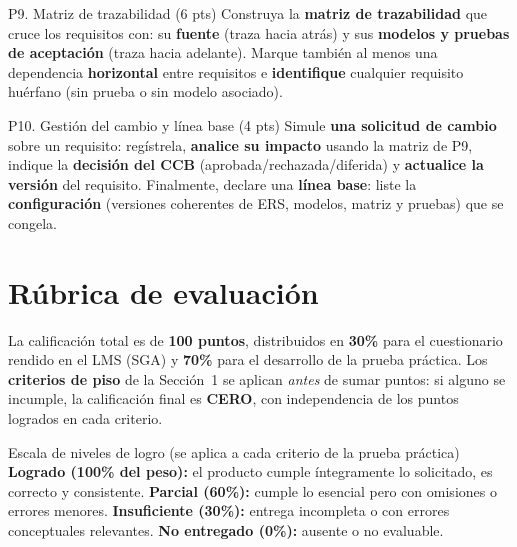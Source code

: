 \documentclass[11pt,a4paper,oneside]{article}
\begin{document}
\begin{tarea}{P9. Matriz de trazabilidad \hfill (6 pts)}
Construya la \textbf{matriz de trazabilidad} que cruce los requisitos con: su \textbf{fuente} (traza hacia atr\'as) y sus \textbf{modelos y pruebas de aceptaci\'on} (traza hacia adelante). Marque tambi\'en al menos una dependencia \textbf{horizontal} entre requisitos e \textbf{identifique} cualquier requisito hu\'erfano (sin prueba o sin modelo asociado).
\end{tarea}

\begin{tarea}{P10. Gesti\'on del cambio y l\'inea base \hfill (4 pts)}
Simule \textbf{una solicitud de cambio} sobre un requisito: reg\'istrela, \textbf{analice su impacto} usando la matriz de P9, indique la \textbf{decisi\'on del CCB} (aprobada/rechazada/diferida) y \textbf{actualice la versi\'on} del requisito. Finalmente, declare una \textbf{l\'inea base}: liste la \textbf{configuraci\'on} (versiones coherentes de ERS, modelos, matriz y pruebas) que se congela.
\end{tarea}

\section{R\'ubrica de evaluaci\'on}

La calificaci\'on total es de \textbf{100 puntos}, distribuidos en \textbf{30\%} para el cuestionario rendido en el LMS (SGA) y \textbf{70\%} para el desarrollo de la prueba pr\'actica. Los \textbf{criterios de piso} de la Secci\'on~1 se aplican \emph{antes} de sumar puntos: si alguno se incumple, la calificaci\'on final es \textbf{CERO}, con independencia de los puntos logrados en cada criterio.

\begin{concepto}{Escala de niveles de logro (se aplica a cada criterio de la prueba pr\'actica)}
\textbf{Logrado (100\% del peso):} el producto cumple \'integramente lo solicitado, es correcto y consistente. \quad \textbf{Parcial (60\%):} cumple lo esencial pero con omisiones o errores menores. \quad \textbf{Insuficiente (30\%):} entrega incompleta o con errores conceptuales relevantes. \quad \textbf{No entregado (0\%):} ausente o no evaluable.
\end{concepto}
\end{document}

